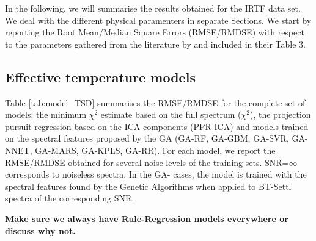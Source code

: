
In the following, we will summarise the results obtained for the IRTF
data set. We deal with the different physical paramenters in separate
Sections. We start by reporting the Root Mean/Median Square Errors
(RMSE/RMDSE) with respect to the parameters gathered from the
literature by \cite{cesetti} and included in their Table 3.

\subsection{Effective temperature models}

Table \ref{tab:model_TSD} summarises the RMSE/RMDSE for the complete
set of models: the minimum $\chi^2$ estimate based on the full
spectrum ($\chi^2$), the projection pursuit regression based on the
ICA components (PPR-ICA) and models trained on the spectral features
proposed by the GA (GA-RF, GA-GBM, GA-SVR, GA-NNET, GA-MARS,
GA-KPLS, GA-RR). For each model, we report the RMSE/RMDSE obtained for
several noise levels of the training sets.  SNR=$\infty$ corresponds
to noiseless spectra. In the GA- cases, the model is trained with
  the spectral features found by the Genetic Algorithms when applied
  to BT-Settl spectra of the corresponding SNR.

{\bf Make sure we always have Rule-Regression models everywhere or
  discuss why not.}
  
